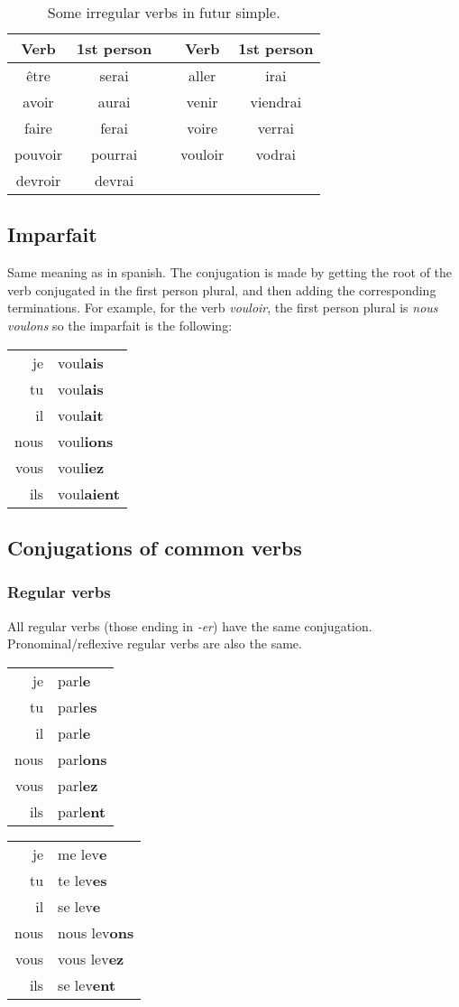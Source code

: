 \documentclass[palatino]{nicenotes}
\newcommand{\conjug}[6]{\begin{tabular}{rl}
je & #1 \\
tu & #2 \\
il & #3 \\
nous & #4 \\
vous & #5 \\
ils & #6 \\
\end{tabular}}
\begin{document}
\begin{table}
\centering
\begin{tabular}{cc|p{0.05cm}|cc}
\toprule
\textbf{Verb} & \textbf{1st person } & & \textbf{Verb} & \textbf{1st person }  \\
\midrule
\^etre & serai & & aller & irai \\
avoir & aurai & & venir & viendrai \\
faire & ferai & & voire & verrai \\
pouvoir & pourrai & & vouloir & vodrai \\
devroir & devrai & &  & \\ \bottomrule
\end{tabular}
\caption{Some irregular verbs in futur simple.}
\label{tab:FutureIrregular}
\end{table}

\subsection{Imparfait}

Same meaning as in spanish. The conjugation is made by getting the root of the verb conjugated in the first person plural, and then adding the corresponding terminations. For example, for the verb \textit{vouloir}, the first person plural is \textit{nous voulons} so the imparfait is the following:

\begin{center}
\conjug
	{voul\textbf{ais}}
	{voul\textbf{ais}}
	{voul\textbf{ait}}
	{voul\textbf{ions}}
	{voul\textbf{iez}}
	{voul\textbf{aient}}
\end{center}

\subsection{Conjugations of common verbs}

\subsubsection{Regular verbs}

All regular verbs (those ending in \textit{-er}) have the same conjugation. Pronominal/reflexive regular verbs are also the same.

\begin{minipage}{0.45\textwidth}
\centering
\conjug
	{parl\textbf{e}}
	{parl\textbf{es}}
	{parl\textbf{e}}
	{parl\textbf{ons}}
	{parl\textbf{ez}}
	{parl\textbf{ent}}
\end{minipage}
\begin{minipage}{0.45\textwidth}
\centering
\conjug
	{me lev\textbf{e}}
	{te lev\textbf{es}}
	{se lev\textbf{e}}
	{nous lev\textbf{ons}}
	{vous lev\textbf{ez}}
	{se lev\textbf{ent}}
\end{minipage}
\end{document}
